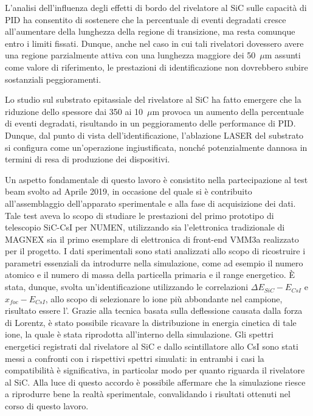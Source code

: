 L'analisi dell'influenza degli effetti di bordo del rivelatore al SiC sulle capacità di PID ha consentito di sostenere che la percentuale di eventi degradati cresce all'aumentare della lunghezza della regione di transizione, ma resta comunque entro i limiti fissati.
Dunque, anche nel caso in cui tali rivelatori dovessero avere una regione parzialmente attiva con una lunghezza maggiore dei 50~$\mu$m assunti come valore di riferimento, le prestazioni di identificazione non dovrebbero subire sostanziali peggioramenti.



Lo studio sul substrato epitassiale del rivelatore al SiC ha fatto emergere che la riduzione dello spessore dai 350 ai 10~$\mu$m provoca un aumento della percentuale di eventi degradati, risultando in un peggioramento delle performance di PID.
Dunque, dal punto di vista dell'identificazione, l'ablazione LASER del substrato si configura come un'operazione ingiustificata, nonché potenzialmente dannosa in termini di resa di produzione dei dispositivi.


Un aspetto fondamentale di questo lavoro è consistito nella partecipazione al test beam svolto ad Aprile 2019, in occasione del quale si è contribuito all'assemblaggio dell'apparato sperimentale e alla fase di acquisizione dei dati.
Tale test aveva lo scopo di studiare le prestazioni del primo prototipo di telescopio SiC-CsI per NUMEN, utilizzando sia l'elettronica tradizionale di MAGNEX sia il primo esemplare di elettronica di front-end VMM3a realizzato per il progetto.
I dati sperimentali sono stati analizzati allo scopo di ricostruire i parametri essenziali da introdurre nella simulazione, come ad esempio il numero atomico e il numero di massa della particella primaria e il range energetico.
È stata, dunque, svolta un'identificazione utilizzando le correlazioni $\Delta E_{SiC} -E_{CsI}$ e $x_{foc} -E_{CsI}$, allo scopo di selezionare lo ione più abbondante nel campione, risultato essere l'.
Grazie alla tecnica basata sulla deflessione causata dalla forza di Lorentz, è stato possibile ricavare la distribuzione in energia cinetica di tale ione, la quale è stata riprodotta all'interno della simulazione.
Gli spettri energetici registrati dal rivelatore al SiC e dallo scintillatore allo CsI sono stati messi a confronti con i rispettivi spettri simulati: in entrambi i casi la compatibilità è significativa, in particolar modo per quanto riguarda il rivelatore al SiC.
Alla luce di questo accordo è possibile affermare che la simulazione riesce a riprodurre bene la realtà sperimentale, convalidando i risultati ottenuti nel corso di questo lavoro.






